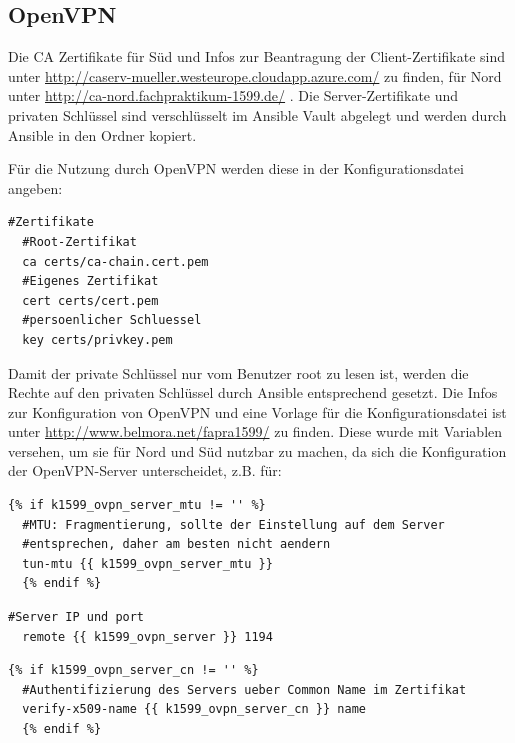 \subsection{OpenVPN}
Die CA Zertifikate für Süd und Infos zur Beantragung der Client-Zertifikate sind unter \url{http://caserv-mueller.westeurope.cloudapp.azure.com/} zu finden, für Nord unter \url{http://ca-nord.fachpraktikum-1599.de/} . Die Server-Zertifikate und privaten Schlüssel sind verschlüsselt im Ansible Vault abgelegt und werden durch Ansible in den Ordner  kopiert.

Für die Nutzung durch OpenVPN werden diese in der Konfigurationsdatei angeben:

\begin{lstlisting}[label=code:openvpn,caption=Auszug aus /etc/openvpn/client.conf]
  #Zertifikate
  #Root-Zertifikat
  ca certs/ca-chain.cert.pem
  #Eigenes Zertifikat
  cert certs/cert.pem
  #persoenlicher Schluessel
  key certs/privkey.pem
\end{lstlisting}

Damit der private Schlüssel nur vom Benutzer root zu lesen ist, werden die Rechte auf den privaten Schlüssel durch Ansible entsprechend gesetzt. Die Infos zur Konfiguration von OpenVPN und eine Vorlage für die Konfigurationsdatei ist unter \url{http://www.belmora.net/fapra1599/} zu finden. Diese wurde mit Variablen versehen, um sie für Nord und Süd nutzbar zu machen, da sich die Konfiguration der OpenVPN-Server unterscheidet, z.B. für:

\begin{lstlisting}[label=code:tunnelmtu,caption=Tunnel-MTU]
  {% if k1599_ovpn_server_mtu != '' %}
  #MTU: Fragmentierung, sollte der Einstellung auf dem Server
  #entsprechen, daher am besten nicht aendern
  tun-mtu {{ k1599_ovpn_server_mtu }}
  {% endif %}
\end{lstlisting}

\begin{lstlisting}[label=code:vpnserver,caption=OpenVPN-Server]
  #Server IP und port
  remote {{ k1599_ovpn_server }} 1194
\end{lstlisting}

\begin{lstlisting}[label=code:certtitle,caption=Zertifikats-Betreff]
  {% if k1599_ovpn_server_cn != '' %}
  #Authentifizierung des Servers ueber Common Name im Zertifikat
  verify-x509-name {{ k1599_ovpn_server_cn }} name
  {% endif %}
\end{lstlisting}

